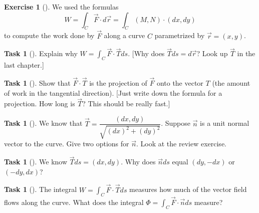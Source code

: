 \documentclass[10pt,]{book}
\theoremstyle{plain}
\theoremstyle{definition}
\theoremstyle{definition}
\theoremstyle{definition}
\theoremstyle{definition}
\newtheorem{exploration}[project]{Exercise}
\newtheorem{task}[project]{Task}
\theoremstyle{definition}
\numberwithin{equation}{section}
\begin{document}
\begin{exploration}[]\label{exploration-194}
We used the formulas%
\begin{equation*}
W = \int_C \vec F\cdot d\vec r  = \int_C (M,N)\cdot(dx,dy)
\end{equation*}
to compute the work done by \(\vec F\) along a curve \(C\) parametrized by \(\vec r = (x,y)\).%
\begin{task}[]\label{task-484}
Explain why \(W = \int_C \vec F\cdot \vec T ds\). [Why does \(\vec T ds = d\vec r\)?  Look up \(\vec T\) in the last chapter.] %
\end{task}
\begin{task}[]\label{task-485}
Show that \(\vec F\cdot \vec T\) is the projection of \(\vec F\) onto the vector \(T\) (the amount of work in the tangential direction). [Just write down the formula for a projection.  How long is \(\vec T\)?  This should be really fast.]%
\end{task}
\begin{task}[]\label{task-486}
We know that \(\vec T = \dfrac{(dx, dy)}{\sqrt{(dx)^2+(dy)^2}}\).  Suppose \(\vec n\) is a unit normal vector to the curve. Give two options for \(\vec n\). Look at the review exercise.%
%
\end{task}
\begin{task}[]\label{task-487}
We know  \(\vec T ds = (dx,dy)\). Why does \(\vec n ds\) equal \((dy,-dx)\) or \((-dy,dx)\)?%
\end{task}
\begin{task}[]\label{task-488}
The integral \(W = \int_C \vec F\cdot \vec T ds\) measures how much of the vector field flows along the curve.  What does the integral \(\Phi = \int_C \vec F\cdot \vec n ds\) measure?%
\end{task}
\end{exploration}
\end{document}

